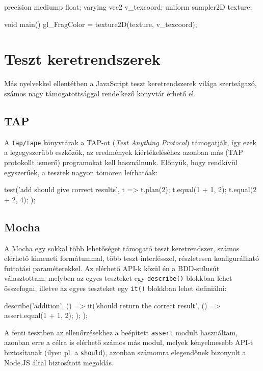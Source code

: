 \begin{glsl}
  precision mediump float;
  varying vec2 v_texcoord;
  uniform sampler2D texture;

  void main() {
    gl_FragColor = texture2D(texture, v_texcoord);
  }
\end{glsl}

\section{Teszt keretrendszerek}\label{sec:testing}

Más nyelvekkel ellentétben a JavaScript teszt keretrendszerek világa
szerteágazó, számos nagy támogatottsággal rendelkező könyvtár érhető el.

\subsection{TAP}

A \texttt{tap/tape} könyvtárak a TAP-ot (\emph{Test Anything Protocol})
támogatják\cite{tap}, így ezek a legegyszerűbb eszközök, az eredmények
kiértékeléséhez azonban más (TAP protokollt ismerő) programokat kell
használnunk. Előnyük, hogy rendkívül egyszerűek, a tesztek nagyon tömören
leírhatóak:

\begin{js}
test('add should give correct results', t => {
  t.plan(2);
  t.equal(1 + 1, 2);
  t.equal(2 + 2, 4);
});
\end{js}

\subsection{Mocha}\label{sec:mocha}

A Mocha egy sokkal több lehetőséget támogató teszt keretrendszer\cite{mocha},
számos elérhető kimeneti formátummal, több teszt interfésszel, részletesen
konfigurálható futtatási paraméterekkel. Az elérhető API-k közül én a
BDD-stílusút választottam, melyben az egyes teszteket egy \texttt{describe()}
blokkban lehet összefogni, illetve az egyes teszteket egy \texttt{it()} blokkban
lehet definiálni:

\begin{js}
describe('addition', () => {
  it('should return the correct result', () => {
    assert.equal(1 + 1, 2);
  });
});
\end{js}

A fenti tesztben az ellenőrzésekhez a beépített \texttt{assert} modult
használtam, azonban erre a célra is elérhető számos más modul, melyek
kényelmesebb API-t biztosítanak (ilyen pl. a \texttt{should}\cite{should}), azonban számomra
elegendőnek bizonyult a Node.JS által biztosított megoldás.


